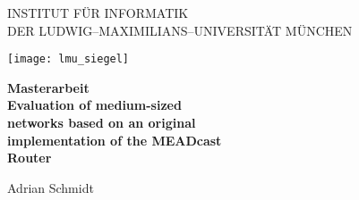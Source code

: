 
\thispagestyle{empty}

\begin{center}

\vspace*{-2cm}

{\Huge INSTITUT FÜR INFORMATIK\\[1mm]}
DER LUDWIG--MAXIMILIANS--UNIVERSITÄT MÜNCHEN\\

\vspace*{1cm}

\texttt{[image: lmu\_siegel]}

\vspace*{2cm}

{\Large \textbf{Masterarbeit}}\\ %

\vspace{2.0cm}
{\Huge \textbf{Evaluation of medium-sized}}\\
\vspace*{3mm}
{\Huge \textbf{networks based on an original}}\\
\vspace*{3mm}
{\Huge \textbf{implementation of the MEADcast}}\\
\vspace*{3mm}
{\Huge \textbf{Router}}\\
\vspace{1.5cm}

{\LARGE Adrian Schmidt} %

\vspace{3cm}

\end{center}

\newpage


\thispagestyle{empty}
\cleardoublepage

